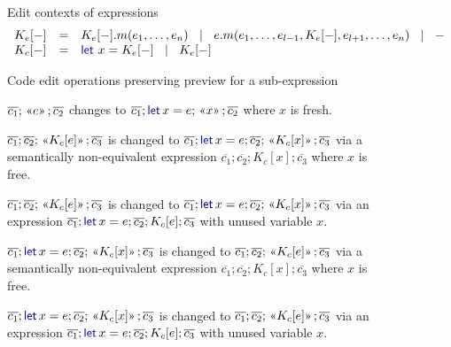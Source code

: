 \documentclass[english,crc]{programming}
\theoremstyle{plain}
\theoremstyle{definition}
\newcommand{\lsep}{\;\;|\;\;}
\newcommand{\kvd}[1]{\textnormal{\textcolor{kvdclr}{\sffamily #1}}}
\newcommand{\rname}[1]{{\sffamily(#1)}}
\newcommand{\ername}[1]{\vspace{0.75em}\rname{#1}\hspace{0.5em}}
\newcommand{\preview}[1]{\,\textnormal{\guillemotleft} #1\textnormal{\guillemotright}\,}
\begin{document}
\begin{figure}[t]
\raggedright
\vspace{-0.5em}
{\small\sffamily Edit contexts of expressions}
\begin{equation*}
\begin{array}{lcl}
K_e[-] &=& K_e[-].m(e_1, \ldots, e_n) ~\lsep~ e.m(e_1, \ldots, e_{l-1}, K_e[-], e_{l+1},\ldots , e_n) ~\lsep~ -\\
K_c[-] &=& \kvd{let}~x = K_e[-] ~\lsep~ K_e[-]\\
\end{array}
\end{equation*}

\vspace{0.5em}
{\small\sffamily Code edit operations preserving preview for a sub-expression}

\hspace{2.5em}\begin{minipage}[c]{0.868\textwidth}
  \raggedright\setlength{\parindent}{-1em}

  \ername{let-intro-var}
  $\overline{c_1}; \preview{e}; \overline{c_2}$ changes to
  $\overline{c_1}; \kvd{let}\,x = e; \preview{x}; \overline{c_2}$ where $x$ is fresh.

  \ername{let-intro-ins}
  $\overline{c_1}; \overline{c_2}; \preview{K_c[e]}; \overline{c_3}$ is changed to
  $\overline{c_1}; \kvd{let}\,x=e; \overline{c_2}; \preview{K_c[x]}; \overline{c_3}$ via
  a semantically non-equivalent expression
  $\overline{c_1}; \overline{c_2}; K_c[x]; \overline{c_3}$ where $x$ is free.

  \ername{let-intro-del}
  $\overline{c_1}; \overline{c_2}; \preview{K_c[e]}; \overline{c_3}$ is changed to
  $\overline{c_1}; \kvd{let}\,x=e; \overline{c_2}; \preview{K_c[x]}; \overline{c_3}$ via
  an expression $\overline{c_1}; \kvd{let}\,x=e; \overline{c_2}; K_c[e]; \overline{c_3}$
  with unused variable $x$.

  \ername{let-elim-del}
  $\overline{c_1}; \kvd{let}\,x=e; \overline{c_2}; \preview{K_c[x]}; \overline{c_3}$ is changed to
  $\overline{c_1}; \overline{c_2}; \preview{K_c[e]}; \overline{c_3}$ via
  a semantically non-equivalent expression
  $\overline{c_1}; \overline{c_2}; K_c[x]; \overline{c_3}$ where $x$ is free.

  \ername{let-elim-ins}
  $\overline{c_1}; \kvd{let}\,x=e; \overline{c_2}; \preview{K_c[x]}; \overline{c_3}$ is changed to
  $\overline{c_1}; \overline{c_2}; \preview{K_c[e]}; \overline{c_3}$ via
  an expression $\overline{c_1}; \kvd{let}\,x=e; \overline{c_2}; K_c[e]; \overline{c_3}$
  with unused variable $x$.


\end{minipage}
\end{figure}
\end{document}
